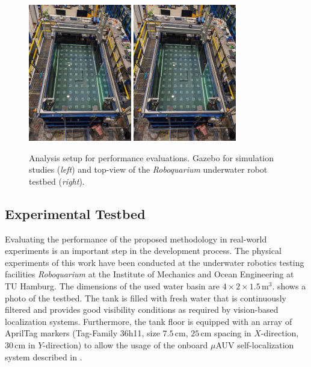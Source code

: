 \begin{figure}
    \centering
    \includegraphics[width=0.4\textwidth]{images/04/roboquarium_tested_topview.jpg}
    \quad\quad
    \includegraphics[width=0.4\textwidth]{images/04/roboquarium_tested_topview.jpg}
    \caption{Analysis setup for performance evaluations. Gazebo for simulation studies (\textit{left}) and top-view of the \textit{Roboquarium} underwater robot testbed (\textit{right}).}
    \label{fig:testbed_topview}
    \label{fig:analysis_setups}
\end{figure}
\subsection{Experimental Testbed}
Evaluating the performance of the proposed methodology in real-world experiments is an important step in the development process.
The physical experiments of this work have been conducted at the underwater robotics testing facilities \textit{Roboquarium} at the Institute of Mechanics and Ocean Engineering at TU Hamburg.
The dimensions of the used water basin are $4\times2\times1.5\,\mathrm{m}^3$.
 shows a photo of the testbed.
The tank is filled with fresh water that is continuously filtered and provides good visibility conditions as required by vision-based localization systems.
Furthermore, the tank floor is equipped with an array of AprilTag markers (Tag-Family 36h11, size $7.5$\,cm, $25$\,cm spacing in $X$-direction, $30$\,cm in $Y$-direction) to allow the usage of the onboard $\mu$AUV self-localization system described in \cite{Duecker20}.



